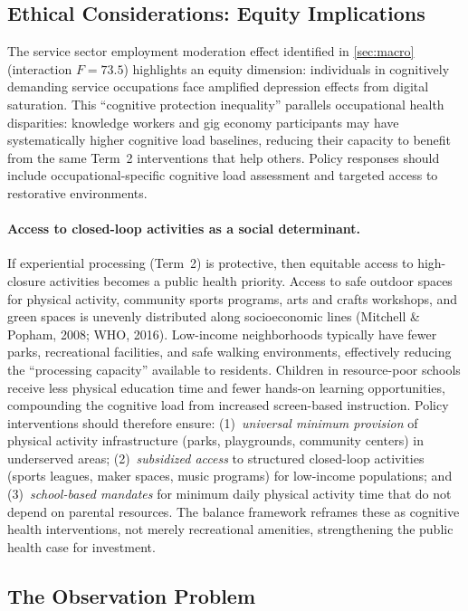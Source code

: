 \documentclass[a4paper,11pt,titlepage]{article}
\begin{document}
\subsection{Ethical Considerations: Equity Implications}\label{sec:ai-implications}

The service sector employment moderation effect identified in \cref{sec:macro} (interaction $F = 73.5$) highlights an equity dimension: individuals in cognitively demanding service occupations face amplified depression effects from digital saturation.  This ``cognitive protection inequality'' parallels occupational health disparities: knowledge workers and gig economy participants may have systematically higher cognitive load baselines, reducing their capacity to benefit from the same Term~2 interventions that help others.  Policy responses should include occupational-specific cognitive load assessment and targeted access to restorative environments.

\paragraph{Access to closed-loop activities as a social determinant.}
If experiential processing (Term~2) is protective, then equitable access to high-closure activities becomes a public health priority. Access to safe outdoor spaces for physical activity, community sports programs, arts and crafts workshops, and green spaces is unevenly distributed along socioeconomic lines (Mitchell \& Popham, 2008; WHO, 2016). Low-income neighborhoods typically have fewer parks, recreational facilities, and safe walking environments, effectively reducing the ``processing capacity'' available to residents. Children in resource-poor schools receive less physical education time and fewer hands-on learning opportunities, compounding the cognitive load from increased screen-based instruction. Policy interventions should therefore ensure: (1)~\textit{universal minimum provision} of physical activity infrastructure (parks, playgrounds, community centers) in underserved areas; (2)~\textit{subsidized access} to structured closed-loop activities (sports leagues, maker spaces, music programs) for low-income populations; and (3)~\textit{school-based mandates} for minimum daily physical activity time that do not depend on parental resources. The balance framework reframes these as cognitive health interventions, not merely recreational amenities, strengthening the public health case for investment.


\subsection{The Observation Problem}
\end{document}
